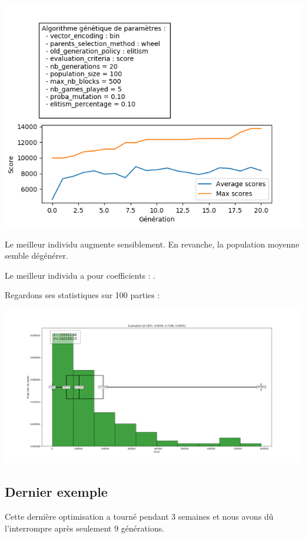\includegraphics[scale=0.95]{media/results/AG13.png}

Le meilleur individu augmente sensiblement. En revanche, la population moyenne semble dégénérer.

\medskip

Le meilleur individu a pour coefficients : \pyth{[0.1407, 0.0039, 0.7186, 0.0455]}.
\newpage

Regardons ses statistiques sur 100 parties :

\includegraphics[scale=0.35]{media/results/Stats_Eval_0,1407_0,0039_0,7186_0,0455.png}

\newpage

\subsection{Dernier exemple}

Cette dernière optimisation a tourné pendant 3 semaines et nous avons dû l'interrompre après seulement 9 générations.

